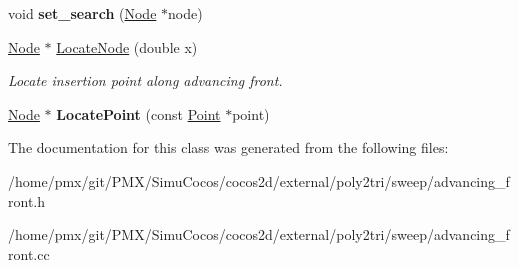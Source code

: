 \begin{DoxyCompactItemize}
void {\bfseries set\+\_\+search} (\hyperlink{structp2t_1_1Node}{Node} $\ast$node)
\item 
\mbox{\label{classp2t_1_1AdvancingFront_ade254f19cfd95e89545dbea1c285d083}} 
\hyperlink{structp2t_1_1Node}{Node} $\ast$ \hyperlink{classp2t_1_1AdvancingFront_ade254f19cfd95e89545dbea1c285d083}{Locate\+Node} (double x)
\begin{DoxyCompactList}\small\item\em Locate insertion point along advancing front. \end{DoxyCompactList}\item 
\mbox{\label{classp2t_1_1AdvancingFront_a76ac8c3f8c6a0d4be39bdeb359e821e2}} 
\hyperlink{structp2t_1_1Node}{Node} $\ast$ {\bfseries Locate\+Point} (const \hyperlink{structp2t_1_1Point}{Point} $\ast$point)
\end{DoxyCompactItemize}


The documentation for this class was generated from the following files\+:\begin{DoxyCompactItemize}
\item 
/home/pmx/git/\+P\+M\+X/\+Simu\+Cocos/cocos2d/external/poly2tri/sweep/advancing\+\_\+front.\+h\item 
/home/pmx/git/\+P\+M\+X/\+Simu\+Cocos/cocos2d/external/poly2tri/sweep/advancing\+\_\+front.\+cc\end{DoxyCompactItemize}
